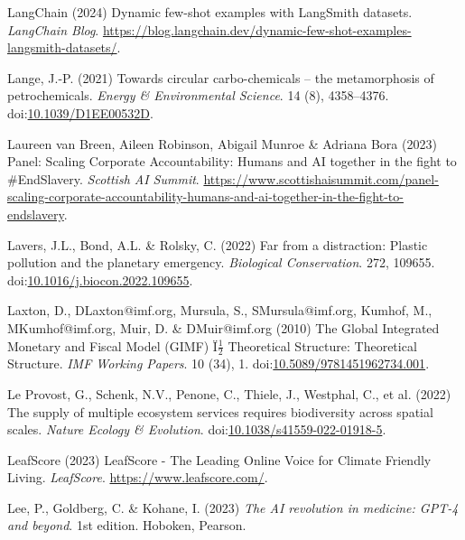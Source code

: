 \documentclass[
  letterpaper,
  DIV=11,
  numbers=noendperiod]{scrartcl}
\newlength{\cslhangindent}
\newenvironment{CSLReferences}[2] %
 {\begin{list}{}{%
  \setlength{\itemindent}{0pt}
  \setlength{\leftmargin}{0pt}
  \setlength{\parsep}{0pt}
  \ifodd #1
   \setlength{\leftmargin}{\cslhangindent}
   \setlength{\itemindent}{-1\cslhangindent}
  \fi
  \setlength{\itemsep}{#2\baselineskip}}}
 {\end{list}}
\begin{document}
\begin{CSLReferences}{0}{1}
LangChain (2024) Dynamic few-shot examples with {LangSmith} datasets.
\emph{LangChain Blog}.
\url{https://blog.langchain.dev/dynamic-few-shot-examples-langsmith-datasets/}.

Lange, J.-P. (2021) Towards circular carbo-chemicals -- the
metamorphosis of petrochemicals. \emph{Energy \& Environmental Science}.
14 (8), 4358--4376.
doi:\href{https://doi.org/10.1039/D1EE00532D}{10.1039/D1EE00532D}.

Laureen van Breen, Aileen Robinson, Abigail Munroe \& Adriana Bora
(2023) Panel: {Scaling Corporate Accountability}: {Humans} and {AI}
together in the fight to \#{EndSlavery}. \emph{Scottish AI Summit}.
\url{https://www.scottishaisummit.com/panel-scaling-corporate-accountability-humans-and-ai-together-in-the-fight-to-endslavery}.

Lavers, J.L., Bond, A.L. \& Rolsky, C. (2022) Far from a distraction:
{Plastic} pollution and the planetary emergency. \emph{Biological
Conservation}. 272, 109655.
doi:\href{https://doi.org/10.1016/j.biocon.2022.109655}{10.1016/j.biocon.2022.109655}.

Laxton, D., DLaxton@imf.org, Mursula, S., SMursula@imf.org, Kumhof, M.,
MKumhof@imf.org, Muir, D. \& DMuir@imf.org (2010) The {Global Integrated
Monetary} and {Fiscal Model} ({GIMF})
{Ï}{\textquestiondown}{\(\frac{1}{2}\)} {Theoretical Structure}:
{Theoretical Structure}. \emph{IMF Working Papers}. 10 (34), 1.
doi:\href{https://doi.org/10.5089/9781451962734.001}{10.5089/9781451962734.001}.

Le Provost, G., Schenk, N.V., Penone, C., Thiele, J., Westphal, C., et
al. (2022) The supply of multiple ecosystem services requires
biodiversity across spatial scales. \emph{Nature Ecology \& Evolution}.
doi:\href{https://doi.org/10.1038/s41559-022-01918-5}{10.1038/s41559-022-01918-5}.

LeafScore (2023) {LeafScore} - {The Leading Online Voice} for {Climate
Friendly Living}. \emph{LeafScore}. \url{https://www.leafscore.com/}.

Lee, P., Goldberg, C. \& Kohane, I. (2023) \emph{The {AI} revolution in
medicine: {GPT-4} and beyond}. 1st edition. Hoboken, Pearson.


\end{CSLReferences}
\end{document}
